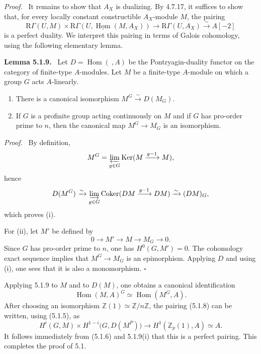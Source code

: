 \documentclass[11pt]{article}
\theoremstyle{plain}
\theoremstyle{definition}
\theoremstyle{remark}
\newenvironment{statement}[1]{\par\medskip\noindent\textbf{#1.}\ }{\par\medskip}
\newenvironment{prooftext}{\par\noindent\textit{Proof.}\ }{\par\medskip}
\newcommand{\ZZ}{\mathbb Z}
\DeclareMathOperator{\Hom}{Hom}
\DeclareMathOperator{\Ker}{Ker}
\DeclareMathOperator{\Coker}{Coker}
\newcommand{\R}{\mathrm R}
\newcommand{\qedtext}{\hfill$\square$}
\begin{document}
\begin{prooftext}
It remains to show that $A_X$ is dualizing. By 4.7.17, it suffices to show that, for every locally constant constructible $A_X$-module $M$, the pairing
\[
   \R\Gamma(U,M)\times \R\Gamma(U,\underline{\Hom}(M,A_X))
      \longrightarrow \R\Gamma(U,A_X)\xrightarrow{\sim}A[-2]\tag{5.1.8}
\]
is a perfect duality. We interpret this pairing in terms of Galois cohomology, using the following elementary lemma.
\end{prooftext}

\begin{statement}{Lemma 5.1.9}
Let $D=\Hom(\ ,A)$ be the Pontryagin-duality functor on the category of finite-type $A$-modules. Let $M$ be a finite-type $A$-module on which a group $G$ acts $A$-linearly.
\begin{enumerate}[label=(\roman*)]
\item There is a canonical isomorphism $M^G\xrightarrow{\sim}D(M_G)$.
\item If $G$ is a profinite group acting continuously on $M$ and if $G$ has pro-order prime to $n$, then the canonical map $M^G\to M_G$ is an isomorphism.
\end{enumerate}
\end{statement}

\begin{prooftext}
By definition,
\[
   M^G=\varprojlim_{g\in G}\Ker(M\xrightarrow{g-1}M),
\]
hence
\[
   D(M^G)\xrightarrow{\sim}\varinjlim_{g\in G}
        \Coker(DM\xrightarrow{g-1}DM)
      \xrightarrow{\sim}(DM)_G,
\]
which proves (i).

For (ii), let $M'$ be defined by
\[
   0\longrightarrow M'\longrightarrow M\longrightarrow M_G\longrightarrow0.
\]
Since $G$ has pro-order prime to $n$, one has $H^0(G,M')=0$. The cohomology exact sequence implies that $M^G\to M_G$ is an epimorphism. Applying $D$ and using (i), one sees that it is also a monomorphism. \qedtext
\end{prooftext}

Applying 5.1.9 to $M$ and to $D(M)$, one obtains a canonical identification
\[
   \Hom(M,A)^G\simeq \Hom(M^G,A).
\]
After choosing an isomorphism $\ZZ(1)\simeq\ZZ/n\ZZ$, the pairing (5.1.8) can be written, using (5.1.5), as
\[
   H^i(G,M)\times H^{1-i}\bigl(G,D(M^P)\bigr)
      \longrightarrow H^1(\ZZ_p(1),A)\simeq A.\tag{5.1.8'}
\]
It follows immediately from (5.1.6) and 5.1.9(i) that this is a perfect pairing. This completes the proof of 5.1.
\end{document}
